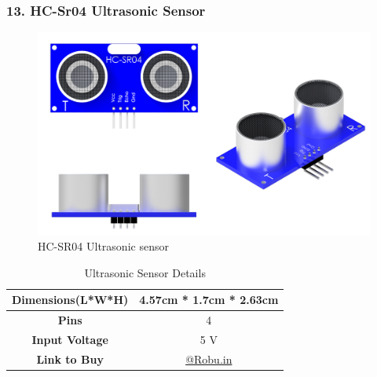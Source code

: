\documentclass[12pt,a4paper,oneside]{book}
\begin{document}
			\subsubsection*{13. HC-Sr04 Ultrasonic Sensor}
				\begin{figure}[H]
					\centering					
					\includegraphics[scale=1]{ULTRASONIC FULL}
					\caption{HC-SR04 Ultrasonic sensor}	 
				\end{figure}
				\begin{table}[H]
				\centering
				\def\arraystretch{1.5}
					\caption{Ultrasonic Sensor Details}
					\vspace{0.5cm}
					\begin{tabular}{|c||c|}
					\hline
						\textbf{Dimensions(L*W*H)} & 4.57cm * 1.7cm * 2.63cm\\\hline
						\textbf{Pins} & 4\\\hline
						\textbf{Input Voltage} & 5 V\\\hline
						\textbf{Link to Buy} & \href{https://robu.in/product/hc-sr04-ultrasonic-range-finder/}{@Robu.in}\\\hline
					\end{tabular}
				\end{table}
				\pagebreak
				
\end{document}
